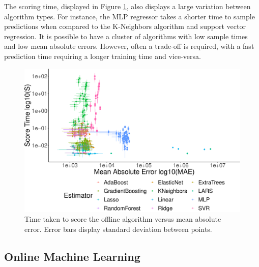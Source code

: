 \documentclass[final,3p,times,twocolumn,numbers]{elsarticle}
\begin{document}
The scoring time, displayed in Figure \ref{fig:offline_score_time_vs_mae}, also displays a large variation between algorithm types. For instance, the MLP regressor takes a shorter time to sample predictions when compared to the K-Neighbors algorithm and support vector regression. It is possible to have a cluster of algorithms with low sample times and low mean absolute errors. However, often a trade-off is required, with a fast prediction time requiring a longer training time and vice-versa. 



\begin{figure}[h]
\centering
\includegraphics[width=\columnwidth]{figures/results/offline_score_time_vs_mae_all_results_opaque.eps}
\caption{Time taken to score the offline algorithm versus mean absolute error. Error bars display standard deviation between points.}
\label{fig:offline_score_time_vs_mae}
\end{figure}









\subsection{Online Machine Learning}
\end{document}
